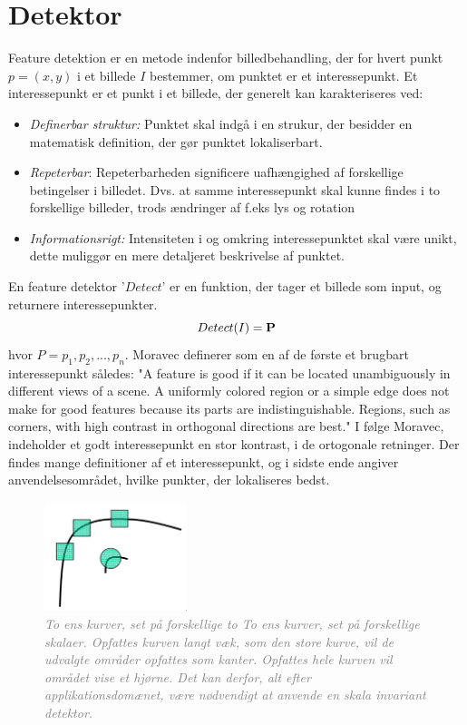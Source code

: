 \section{Detektor}\label{sec:detect}
Feature detektion er en metode indenfor billedbehandling, der for hvert punkt $p = (x,y)$ i et billede $I$ bestemmer, om punktet er et interessepunkt. Et interessepunkt er et punkt i et billede, der generelt kan karakteriseres ved\cite{pointsurvey}:
\begin{itemize}
\item{\textit{Definerbar struktur:} Punktet skal indgå i en strukur, der besidder en matematisk definition, der gør punktet lokaliserbart.}
\item{\emph{Repeterbar}: Repeterbarheden significere uafhængighed af forskellige betingelser i billedet. Dvs. at samme interessepunkt skal kunne findes i to forskellige billeder, trods ændringer af f.eks lys og rotation}
\item{\emph{Informationsrigt:}
Intensiteten i og omkring interessepunktet skal være unikt, dette muliggør en mere detaljeret beskrivelse af punktet.}
\end{itemize}
En feature detektor '$Detect$' er en funktion, der tager et billede som input, og returnere interessepunkter.
\begin{equation}
Detect(I)= \bold{P}
\label{detect}
\end{equation}
hvor $P = {p_1, p_2,..., p_n}$.
Moravec \cite{moravec} definerer som en af de første et brugbart interessepunkt således: "A
feature is good if it can be located unambiguously in different views of a scene. A
uniformly colored region or a simple edge does not make for good features because
its parts are indistinguishable. Regions, such as corners, with high contrast in
orthogonal directions are best." I følge Moravec, indeholder et godt interessepunkt en stor kontrast, i de ortogonale retninger. Der findes mange definitioner af et interessepunkt, og i sidste ende angiver anvendelsesområdet, hvilke punkter, der lokaliseres bedst.
\begin{figure}[H]
    \centering
    \includegraphics[width=0.37\textwidth]{fig/28.png}
     \vspace{-1em}
    \begin{center}    
       \caption{\textcolor{gray}{\footnotesize \textit{To ens kurver, set på forskellige to To ens kurver, set på forskellige skalaer. Opfattes kurven langt væk, som den store kurve, vil de udvalgte områder opfattes som kanter. Opfattes hele kurven vil området vise et hjørne. Det kan derfor, alt efter applikationsdomænet, være nødvendigt at anvende en skala invariant detektor.}}}
    \label{fig:skal}
     \end{center}
     \vspace{-2.5em}
  \end{figure} \noindent
